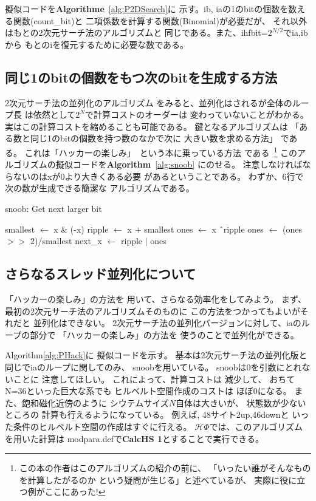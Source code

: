 \documentclass[prb,aps,showpacs,preprint,nofootinbib]{revtex4}
\newcommand{\lef}{\leftarrow}
\newcommand{\HPhi}{\mathcal{H}\Phi}
\begin{document}
擬似コードを{\bf Algorithme}~\ref{alg:P2DSearch}に
示す。ib, iaの1のbitの個数を数える関数(count\_bit)と
二項係数を計算する関数(Binomial)が必要だが、
それ以外はもとの2次元サーチ法のアルゴリズムと
同じである。また、ihfbit=$2^{N/2}$でia,ibから
もとのiを復元するために必要な数である。

\newpage
\subsection{同じ1のbitの個数をもつ次のbitを生成する方法}
\label{sec:snoob}
2次元サーチ法の並列化のアルゴリズム
をみると、並列化はされるが全体のループ長
は依然として$2^{N}$で計算コストのオーダーは
変わっていないことがわかる。
実はこの計算コストを縮めることも可能である。
鍵となるアルゴリズムは
「ある数と同じ1のbitの個数を持つ数のなかで次に
大きい数を求める方法」
である。
これは「ハッカーの楽しみ」~\cite{hacker,hacker_jp}という本に乗っている方法
である~\footnote{この本の作者はこのアルゴリズムの紹介の前に、
「いったい誰がそんなものを計算したがるのか
という疑問が生じる」と述べているが、
実際に役に立つ例がここにあった!}
このアルゴリズムの擬似コードを{\bf Algorithm}~\ref{alg:snoob}
にのせる。
注意しなければならないのはxが0より大きくある必要
があるということである。
わずか、6行で次の数が生成できる簡潔な
アルゴリズムである。

\begin{algorithm}                      
\caption{snoob: Get next larger bit}         
\begin{algorithmic}                  
\STATE smallest $\lef$ x $\&$ (-x)
\STATE ripple $\lef$ x $+$ smallest
\STATE ones $\lef$ x \^\ ripple
\STATE ones $\lef$ (ones $>>$ 2)/smallest
\STATE next\_x $\lef$ ripple $|$ ones
\end{algorithmic}
\label{alg:snoob}                          
\end{algorithm}


\subsection{さらなるスレッド並列化について}
「ハッカーの楽しみ」の方法を
用いて、さらなる効率化をしてみよう。
まず、最初の2次元サーチ法のアルゴリズムそのものに
この方法をつかってもよいがそれだと
並列化はできない。
2次元サーチ法の並列化バージョンに対して、iaのループの部分で
「ハッカーの楽しみ」の方法を
使うのことで並列化ができる。

Algorithm\ref{alg:PHack}に
擬似コードを示す。
基本は2次元サーチ法の並列化版と
同じでiaのループに関してのみ、
snoobを用いている。
snoobは0を引数にとれないことに
注意してほしい。
これによって、計算コストは
減少して、
おちてN=36といった巨大な系でも
ヒルベルト空間作成のコストは
ほぼ0になる。
また、飽和磁化近傍のように
シウテムサイズ$N$自体は大きいが、
状態数が少ないところの
計算も行えるようになっている。
例えば, 48サイト2up,46downと
いった条件のヒルベルト空間の作成はすぐに行える。
$\HPhi$では、このアルゴリズムを用いた計算は
modpara.defで{\bf CalcHS  1}とすることで実行できる。
\end{document}
